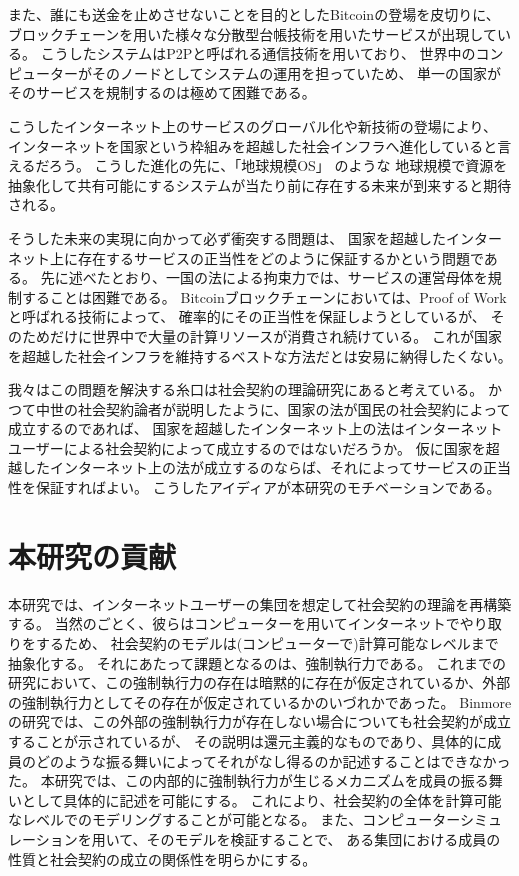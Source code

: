   また、誰にも送金を止めさせないことを目的としたBitcoin\cite{Nakamoto 2008}の登場を皮切りに、
  ブロックチェーンを用いた様々な分散型台帳技術を用いたサービスが出現している。
  こうしたシステムはP2Pと呼ばれる通信技術を用いており、
  世界中のコンピューターがそのノードとしてシステムの運用を担っていため、
  単一の国家がそのサービスを規制するのは極めて困難である。
  
  こうしたインターネット上のサービスのグローバル化や新技術の登場により、
  インターネットを国家という枠組みを超越した社会インフラへ進化していると言えるだろう。
  こうした進化の先に、「地球規模OS」\cite{Saito Ikemoto} のような
  地球規模で資源を抽象化して共有可能にするシステムが当たり前に存在する未来が到来すると期待される。

  そうした未来の実現に向かって必ず衝突する問題は、
  国家を超越したインターネット上に存在するサービスの正当性をどのように保証するかという問題である。
  先に述べたとおり、一国の法による拘束力では、サービスの運営母体を規制することは困難である。
  Bitcoinブロックチェーンにおいては、Proof of Workと呼ばれる技術によって、
  確率的にその正当性を保証しようとしているが、
  そのためだけに世界中で大量の計算リソースが消費され続けている。
  これが国家を超越した社会インフラを維持するベストな方法だとは安易に納得したくない。

  我々はこの問題を解決する糸口は社会契約の理論研究にあると考えている。
  かつて中世の社会契約論者が説明したように、国家の法が国民の社会契約によって成立するのであれば、
  国家を超越したインターネット上の法はインターネットユーザーによる社会契約によって成立するのではないだろうか。
  仮に国家を超越したインターネット上の法が成立するのならば、それによってサービスの正当性を保証すればよい。
  こうしたアイディアが本研究のモチベーションである。

  \section{本研究の貢献}
  本研究では、インターネットユーザーの集団を想定して社会契約の理論を再構築する。
  当然のごとく、彼らはコンピューターを用いてインターネットでやり取りをするため、
  社会契約のモデルは(コンピューターで)計算可能なレベルまで抽象化する。
  それにあたって課題となるのは、強制執行力である。
  これまでの研究において、この強制執行力の存在は暗黙的に存在が仮定されているか、外部の強制執行力としてその存在が仮定されているかのいづれかであった。
  Binmoreの研究では、この外部の強制執行力が存在しない場合についても社会契約が成立することが示されている\cite{Binmore 2005}が、
  その説明は還元主義的なものであり、具体的に成員のどのような振る舞いによってそれがなし得るのか記述することはできなかった。
  本研究では、この内部的に強制執行力が生じるメカニズムを成員の振る舞いとして具体的に記述を可能にする。
  これにより、社会契約の全体を計算可能なレベルでのモデリングすることが可能となる。
  また、コンピューターシミュレーションを用いて、そのモデルを検証することで、
  ある集団における成員の性質と社会契約の成立の関係性を明らかにする。

